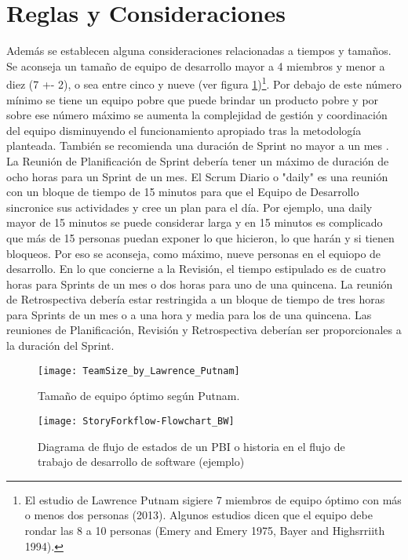 \section{Reglas y Consideraciones}

Además se establecen alguna consideraciones relacionadas a tiempos y tamaños. Se aconseja un tamaño de equipo de desarrollo mayor a 4 miembros y menor a diez (7 +- 2), o sea entre cinco y nueve (ver figura \ref{fig:TeamSize_by_Lawrence_Putnam})\footnote{El estudio de Lawrence Putnam sigiere 7 miembros de equipo óptimo con más o menos dos personas (2013). Algunos estudios dicen que el equipo debe rondar las 8 a 10 personas (Emery and Emery 1975, Bayer and Highsrriith 1994).}. Por debajo de este número mínimo se tiene un equipo pobre que puede brindar un producto pobre y por sobre ese número máximo se aumenta la complejidad de gestión y coordinación del equipo disminuyendo el funcionamiento apropiado tras la metodología planteada. También se recomienda una duración de Sprint no mayor a un mes \cite{Ken-Jeff-2013}. La Reunión de Planificación de Sprint debería tener un máximo de duración de ocho horas para un Sprint de un mes. El Scrum Diario o "daily" es una reunión con un bloque de tiempo de 15 minutos para que el Equipo de Desarrollo sincronice sus actividades y cree un plan para el día. Por ejemplo, una daily mayor de 15 minutos se puede considerar larga y en 15 minutos es complicado que más de 15 personas puedan exponer lo que hicieron, lo que harán y si tienen bloqueos. Por eso se aconseja, como máximo, nueve personas en el equiopo de desarrollo. En lo que concierne a la Revisión, el tiempo estipulado es de cuatro horas para Sprints de un mes o dos horas para uno de una quincena. La reunión de Retrospectiva  debería estar restringida a un bloque de tiempo de tres horas para Sprints de un mes o  a una hora y media para los de una quincena. Las reuniones de Planificación, Revisión y Retrospectiva deberían ser proporcionales a la duración del Sprint.

\begin{figure}[h]
  \centering
  \texttt{[image: TeamSize\_by\_Lawrence\_Putnam]}
  \caption{Tamaño de equipo óptimo según Putnam.}
  \centering
  \label{fig:TeamSize_by_Lawrence_Putnam} 
\end{figure}

\begin{figure}[h]
  \centering
  \texttt{[image: StoryForkflow-Flowchart\_BW]}
  \caption{Diagrama de flujo de estados de un PBI o historia en el flujo de trabajo de desarrollo de software (ejemplo)}
  \centering
  \label{fig:StoryForkflow-Flowchart_BW} 
\end{figure}

